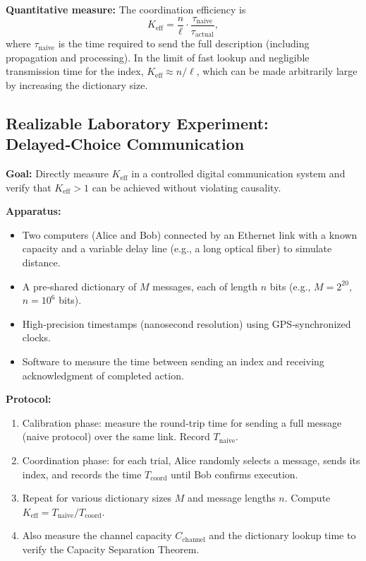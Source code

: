 \documentclass[12pt]{article}
\begin{document}
	\textbf{Quantitative measure:}
	The coordination efficiency is
	\[
	K_{\mathrm{eff}} = \frac{n}{\ell} \cdot \frac{\tau_{\text{naive}}}{\tau_{\text{actual}}},
	\]
	where \(\tau_{\text{naive}}\) is the time required to send the full description (including propagation and processing). In the limit of fast lookup and negligible transmission time for the index, \(K_{\mathrm{eff}} \approx n/\ell\), which can be made arbitrarily large by increasing the dictionary size.
	
	\subsection{Realizable Laboratory Experiment: Delayed‑Choice Communication}
	\label{subsec:lab-delayed-choice}
	
	\textbf{Goal:} Directly measure \(K_{\mathrm{eff}}\) in a controlled digital communication system and verify that \(K_{\mathrm{eff}} > 1\) can be achieved without violating causality.
	
	\textbf{Apparatus:}
	\begin{itemize}
		\item Two computers (Alice and Bob) connected by an Ethernet link with a known capacity and a variable delay line (e.g., a long optical fiber) to simulate distance.
		\item A pre‑shared dictionary of \(M\) messages, each of length \(n\) bits (e.g., \(M = 2^{20}\), \(n = 10^6\) bits).
		\item High‑precision timestamps (nanosecond resolution) using GPS‑synchronized clocks.
		\item Software to measure the time between sending an index and receiving acknowledgment of completed action.
	\end{itemize}
	
	\textbf{Protocol:}
	\begin{enumerate}
		\item Calibration phase: measure the round‑trip time for sending a full message (naive protocol) over the same link. Record \(T_{\text{naive}}\).
		\item Coordination phase: for each trial, Alice randomly selects a message, sends its index, and records the time \(T_{\text{coord}}\) until Bob confirms execution.
		\item Repeat for various dictionary sizes \(M\) and message lengths \(n\). Compute \(K_{\mathrm{eff}} = T_{\text{naive}} / T_{\text{coord}}\).
		\item Also measure the channel capacity \(C_{\text{channel}}\) and the dictionary lookup time to verify the Capacity Separation Theorem.
	\end{enumerate}
	
\end{document}

